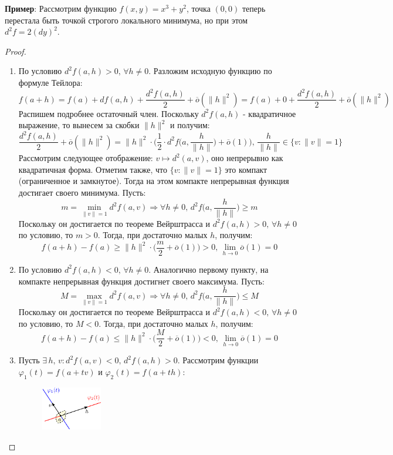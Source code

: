 \documentclass[12pt]{article}
\theoremstyle{definition}
\begin{document}
\textbf{Пример}: Рассмотрим функцию $f(x,y) = x^3 + y^2$, точка $(0,0)$ теперь перестала быть точкой строгого локального минимума, но при этом $d^2f = 2(dy)^2$.
\begin{proof}\hfill
	\begin{enumerate}[label ={(\arabic*)}]
		\item По условию $d^2f(a,h) > 0, \, \forall h \neq 0$. Разложим исходную функцию по формуле Тейлора:
		$$
			f(a + h) = f(a) + df(a,h) +  \dfrac{d^2f(a,h)}{2} + \overline{o}(\|h\|^2) = f(a) + 0 +  \dfrac{d^2f(a,h)}{2} + \overline{o}(\|h\|^2)
		$$
		Распишем подробнее остаточный член. Поскольку $d^2f(a,h)$ - квадратичное выражение, то вынесем за скобки $\|h\|^2$ и получим:
		$$
			\dfrac{d^2f(a,h)}{2} + \overline{o}(\|h\|^2) =\|h\|^2{\cdot}\bigg(\dfrac{1}{2}{\cdot}d^2f\bigg(a,\dfrac{h}{\|h\|}\bigg) + \overline{o}(1) \bigg), \, \dfrac{h}{\|h\|} \in \{v \colon \|v\| = 1\}
		$$
		Рассмотрим следующее отображение: $v \mapsto d^2(a,v)$, оно непрерывно как квадратичная форма. Отметим также, что $\{v \colon \|v\| = 1\}$ это компакт (ограниченное и замкнутое). Тогда на этом компакте непрерывная функция достигает своего минимума. Пусть: 
		$$
			m = \min\limits_{\|v\| = 1}d^2f(a,v) \Rightarrow \forall h \neq 0, \, d^2f\bigg(a,\dfrac{h}{\|h\|}\bigg) \geq m
		$$
		Поскольку он достигается по теореме Вейрштрасса и $d^2f(a,h) > 0, \, \forall h \neq 0$ по условию, то $m > 0$. Тогда, при достаточно малых $h$, получим:
		$$
			f(a + h) - f(a) \geq \|h\|^2{\cdot}\bigg(\dfrac{m}{2} + \overline{o}(1)\bigg) > 0, \, \lim\limits_{h \to 0} \overline{o}(1) = 0
		$$
		\item По условию $d^2f(a,h) < 0, \, \forall h \neq 0$. Аналогично первому пункту, на компакте непрерывная функция достигнет своего максимума. Пусть:
		$$
			M = \max\limits_{\|v\| = 1}d^2f(a,v) \Rightarrow \forall h \neq 0, \, d^2f\bigg(a,\dfrac{h}{\|h\|}\bigg) \leq M
		$$
		Поскольку он достигается по теореме Вейрштрасса и $d^2f(a,h) < 0, \, \forall h \neq 0$ по условию, то $M < 0$. Тогда, при достаточно малых $h$, получим:
		$$
			f(a + h) - f(a) \leq \|h\|^2{\cdot}\bigg(\dfrac{M}{2} + \overline{o}(1)\bigg) < 0, \, \lim\limits_{h \to 0} \overline{o}(1) = 0
		$$
		\item Пусть $\exists \, h, \, v \colon d^2f(a,v) < 0 , \, d^2f(a,h) > 0$. Рассмотрим функции $\varphi_1(t) = f(a + tv)$ и $\varphi_2(t) = f(a + th)$:
		\begin{figure}[H]
			\centering
			\includegraphics[width=0.25\textwidth]{18_3.eps}

\end{figure}
\end{enumerate}
\end{proof}
\end{document}

